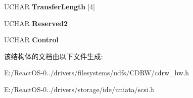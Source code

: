 \begin{DoxyCompactItemize}
\item 
\mbox{\label{struct___c_d_b_1_1___c_d_b12_a83628f7146c6f5e2a3471cebe46abb1b}} 
U\+C\+H\+AR {\bfseries Transfer\+Length} \mbox{[}4\mbox{]}
\item 
\mbox{\label{struct___c_d_b_1_1___c_d_b12_a62f7ef74bb1425c6c9f82b9283c39b8e}} 
U\+C\+H\+AR {\bfseries Reserved2}
\item 
\mbox{\label{struct___c_d_b_1_1___c_d_b12_ad28f1df89e3af9a060ca28b23af8aaf7}} 
U\+C\+H\+AR {\bfseries Control}
\end{DoxyCompactItemize}


该结构体的文档由以下文件生成\+:\begin{DoxyCompactItemize}
\item 
E\+:/\+React\+O\+S-\/0../drivers/filesystems/udfs/\+C\+D\+R\+W/cdrw\+\_\+hw.\+h\item 
E\+:/\+React\+O\+S-\/0../drivers/storage/ide/uniata/scsi.\+h\end{DoxyCompactItemize}
